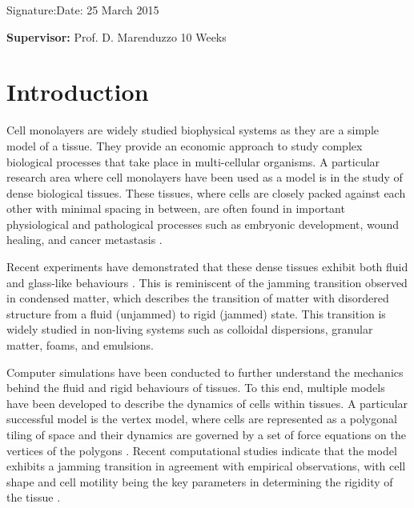 \documentclass[a4paper,12pt]{article}
\begin{document}
\vspace*{2cm}
Signature:\hspace*{8cm}Date: 25 March 2015

\vfill
{\bf Supervisor:} Prof. D. Marenduzzo                 %
\hfill
10 Weeks                                         %
\newpage
%
\pagestyle{plain}                               %
\setcounter{page}{1}                            %
\tableofcontents                                %

\break
\section{Introduction}
Cell monolayers are widely studied biophysical systems as they are a simple model of a tissue. They provide an economic approach to study complex biological processes that take place in multi-cellular organisms. A particular research area where cell monolayers have been used as a model is in the study of dense biological tissues. These tissues, where cells are closely packed against each other with minimal spacing in between, are often found in important physiological and pathological processes such as embryonic development, wound healing, and cancer metastasis \cite{friedl2009}.  

Recent experiments have demonstrated that these dense tissues exhibit both fluid and glass-like behaviours \cite{angelini2010, schoetz2013}. This is reminiscent of the jamming transition observed in condensed matter, which describes the transition of matter with disordered structure from a fluid (unjammed) to rigid (jammed) state. This transition is widely studied in non-living systems such as colloidal dispersions, granular matter, foams, and emulsions. 

Computer simulations have been conducted to further understand the mechanics behind the fluid and rigid behaviours of tissues. To this end, multiple models have been developed to describe the dynamics of cells within tissues. A particular successful model is the vertex model, where cells are represented as a polygonal tiling of space and their dynamics are governed by a set of force equations on the vertices of the polygons \cite{nagai2001}. Recent computational studies indicate that the model exhibits a jamming transition in agreement with empirical observations, with cell shape and cell motility being the key parameters in determining the rigidity of the tissue \cite{bi2015density, bi2015motility}.
\end{document}
